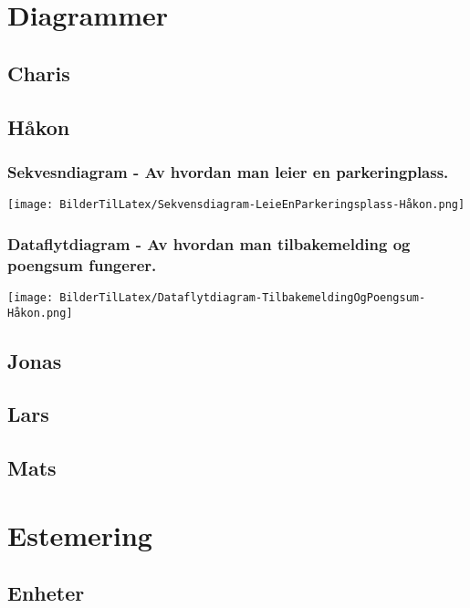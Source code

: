 \documentclass[12pt]{article}
\begin{document}
\section{Diagrammer}

    \subsection{Charis}

    \newpage
    \subsection{Håkon}

        \subsubsection{Sekvesndiagram - Av hvordan man leier en parkeringplass.}
        \texttt{[image: BilderTilLatex/Sekvensdiagram-LeieEnParkeringsplass-Håkon.png]}

        \subsubsection{Dataflytdiagram - Av hvordan man tilbakemelding og poengsum fungerer.}
        \texttt{[image: BilderTilLatex/Dataflytdiagram-TilbakemeldingOgPoengsum-Håkon.png]}

    \subsection{Jonas}

    \subsection{Lars}

    \subsection{Mats}

\section{Estemering}

    \subsection{Enheter}
\end{document}
